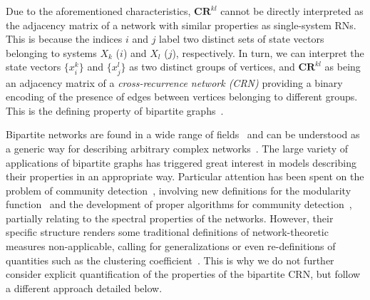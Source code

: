 		Due to the aforementioned characteristics, $\mathbf{CR}^{kl}$ cannot be directly interpreted as the adjacency matrix of a network with similar properties as single-system RNs. This is because the indices $i$ and $j$ label two distinct sets of state vectors belonging to systems $X_k$ ($i$) and $X_l$ ($j$), respectively. In turn, we can interpret the state vectors $\{x^k_i\}$ and $\{x^l_j\}$ as two distinct groups of vertices, and $\mathbf{CR}^{kl}$ as being an adjacency matrix of a \emph{cross-recurrence network (CRN)} providing a binary encoding of the presence of edges between vertices belonging to different groups. This is the defining property of bipartite graphs~\cite{Newman2003}.

		Bipartite networks are found in a wide range of fields~\cite{Guimera2007,Kitsak2011} and can be understood as a generic way for describing arbitrary complex networks~\cite{Guillaume2004,Guillaume2006}. The large variety of applications of bipartite graphs has triggered great interest in models describing their properties in an appropriate way. Particular attention has been spent on the problem of community detection~\cite{Fortunato2010}, involving new definitions for the modularity function~\cite{Barber2007,Guimera2007,Murata2009,Suzuki2009} and the development of proper algorithms for community detection~\cite{Barber2007,Du2008,Lehmann2008,Sawardecker2009}, partially relating to the spectral properties of the networks. However, their specific structure renders some traditional definitions of network-theoretic measures non-applicable, calling for generalizations or even re-definitions of quantities such as the clustering coefficient~\cite{Lind2005,Zhang2008PhysA}. This is why we do not further consider explicit quantification of the properties of the bipartite CRN, but follow a different approach detailed below.

